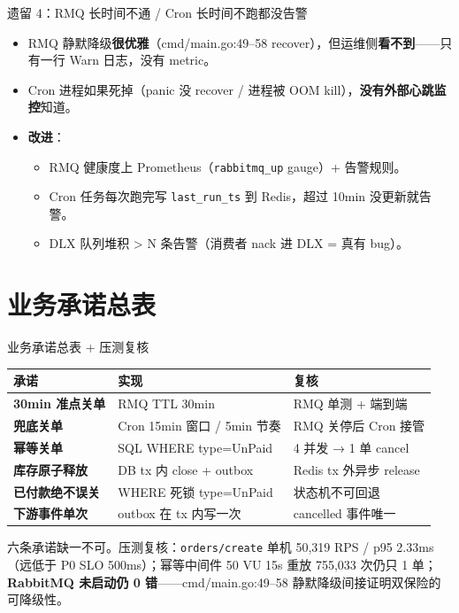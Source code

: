 \begin{frame}{遗留 4：RMQ 长时间不通 / Cron 长时间不跑都没告警}
\begin{itemize}
  \item RMQ 静默降级\textbf{很优雅}（cmd/main.go:49--58 recover），但运维侧\textbf{看不到}——只有一行 Warn 日志，没有 metric。
  \item Cron 进程如果死掉（panic 没 recover / 进程被 OOM kill），\textbf{没有外部心跳监控}知道。
  \item \textbf{改进}：
  \begin{itemize}
    \item RMQ 健康度上 Prometheus（\texttt{rabbitmq\_up} gauge）+ 告警规则。
    \item Cron 任务每次跑完写 \texttt{last\_run\_ts} 到 Redis，超过 10min 没更新就告警。
    \item DLX 队列堆积 > N 条告警（消费者 nack 进 DLX = 真有 bug）。
  \end{itemize}
\end{itemize}
\end{frame}

\section{业务承诺总表}

\begin{frame}{业务承诺总表 + 压测复核}
\begin{tabular}{@{}lll@{}}
\toprule
承诺 & 实现 & 复核 \\
\midrule
\textbf{30min 准点关单}    & RMQ TTL 30min                 & RMQ 单测 + 端到端 \\
\textbf{兜底关单}         & Cron 15min 窗口 / 5min 节奏    & RMQ 关停后 Cron 接管 \\
\textbf{幂等关单}         & SQL WHERE type=UnPaid          & 4 并发 → 1 单 cancel \\
\textbf{库存原子释放}     & DB tx 内 close + outbox        & Redis tx 外异步 release \\
\textbf{已付款绝不误关}   & WHERE 死锁 type=UnPaid         & 状态机不可回退 \\
\textbf{下游事件单次}     & outbox 在 tx 内写一次          & cancelled 事件唯一 \\
\bottomrule
\end{tabular}
\vspace{2mm}
\small 六条承诺缺一不可。压测复核：\texttt{orders/create} 单机 50{,}319 RPS / p95 2.33ms（远低于 P0 SLO 500ms）；幂等中间件 50 VU 15s 重放 755{,}033 次仍只 1 单；\textbf{RabbitMQ 未启动仍 0 错}——cmd/main.go:49--58 静默降级间接证明双保险的可降级性。
\end{frame}


